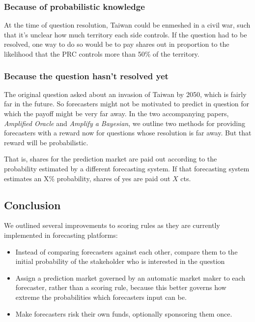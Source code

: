 \documentclass[]{article}
\providecommand{\tightlist}{%
  \setlength{\itemsep}{0pt}\setlength{\parskip}{0pt}}
\begin{document}
\hypertarget{because-of-probabilistic-knowledge}{%
\subsubsection{Because of probabilistic
knowledge}\label{because-of-probabilistic-knowledge}}

At the time of question resolution, Taiwan could be enmeshed in a civil
war, such that it's unclear how much territory each side controls. If
the question had to be resolved, one way to do so would be to pay shares
out in proportion to the likelihood that the PRC controls more than 50\%
of the territory.

\hypertarget{because-the-question-hasnt-resolved-yet}{%
\subsubsection{Because the question hasn't resolved
yet}\label{because-the-question-hasnt-resolved-yet}}

The original question asked about an invasion of Taiwan by 2050, which
is fairly far in the future. So forecasters might not be motivated to
predict in question for which the payoff might be very far away. In the
two accompanying papers, \emph{Amplified Oracle} and \emph{Amplify a
Bayesian}, we outline two methods for providing forecasters with a
reward now for questions whose resolution is far away. But that reward
will be probabilistic.

That is, shares for the prediction market are paid out according to the
probability estimated by a different forecasting system. If that
forecasting system estimates an X\% probability, shares of yes are paid
out \(X\) cts.

\hypertarget{conclusion}{%
\subsection{Conclusion}\label{conclusion}}

We outlined several improvements to scoring rules as they are currently
implemented in forecasting platforms:

\begin{itemize}
\tightlist
\item
  Instead of comparing forecasters against each other, compare them to
  the initial probability of the stakeholder who is interested in the
  question
\item
  Assign a prediction market governed by an automatic market maker to
  each forecaster, rather than a scoring rule, because this better
  governs how extreme the probabilities which forecasters input can be.
\item
  Make forecasters risk their own funds, optionally sponsoring them
  once.
\end{itemize}
\end{document}
